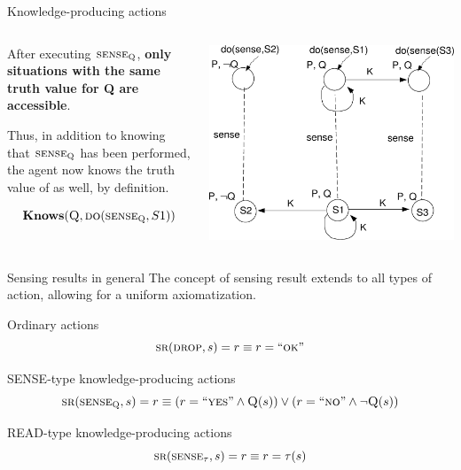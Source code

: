 \begin{frame}{Knowledge-producing actions}
    \begin{columns}
        \begin{column}{0.5\textwidth}
            After executing \( \textsc{sense}_{\textsc{Q}} \),
            \textbf{only situations with the same truth value for Q are accessible}.

            Thus, in addition to knowing that \( \textsc{sense}_{\textsc{Q}} \) has been performed,
            the agent now knows the truth value of \scq{} as well, by definition.

            \[ \textbf{Knows}(\textsc{Q}, \textsc{do}(\textsc{sense}_{\textsc{Q}}, S1)) \]
        \end{column}

        \begin{column}{0.5\textwidth}
            \includegraphics[width=\textwidth]{assets/3states_senseaction}
        \end{column}
    \end{columns}
\end{frame}

\begin{frame}{Sensing results in general}
    The concept of sensing result extends to all types of action, allowing for a uniform axiomatization.

    \begin{block}{Ordinary actions}
        \[ \textsc{sr}(\textsc{drop}, s) = r \equiv r = ``\textsc{ok}" \]
    \end{block}

    \begin{block}{SENSE-type knowledge-producing actions}
        \[ \textsc{sr}(\textsc{sense}_{\textsc{Q}}, s) = r \equiv (r = ``\textsc{yes}" \land \textsc{Q}(s)) \lor (r = ``\textsc{no}" \land \lnot \textsc{Q}(s)) \]
    \end{block}

    \begin{block}{READ-type knowledge-producing actions}
        \[ \textsc{sr}(\textsc{sense}_\tau, s) = r \equiv r = \tau(s) \]
    \end{block}
\end{frame}

